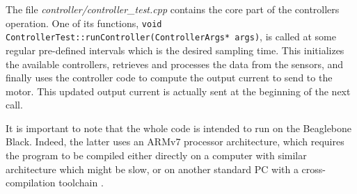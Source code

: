 The file \textit{controller/controller\_test.cpp} contains the core part of the controllers operation. One of its functions, \lstinline[style=customcppinline]{void ControllerTest::runController(ControllerArgs* args)}, is called at some regular pre-defined intervals which is the desired sampling time. This initializes the available controllers, retrieves and processes the data from the sensors, and finally uses the controller code to compute the output current to send to the motor. This updated output current is actually sent at the beginning of the next call.

It is important to note that the whole code is intended to run on the Beaglebone Black. Indeed, the latter uses an ARMv7 processor architecture, which requires the program to be compiled either directly on a computer with similar architecture which might be slow, or on another standard PC with a cross-compilation toolchain \cite{ELinux}.
\\\\